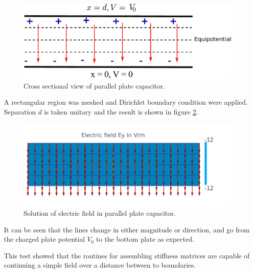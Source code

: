\begin{figure}
\centering
\includegraphics[scale=0.5]{./img/parallel_plate_capacitor.pdf}
\caption{Cross sectional view of parallel plate capacitor.}
\label{fig:parallel_plate}
\end{figure}

A rectangular region  was meshed and Dirichlet boundary condition were applied.  Separation $d$ is taken unitary and the result is shown in figure \ref{fig:capacitor}. 

\begin{figure}
\centering
\includegraphics[scale=0.3]{./img/capacitor.pdf}
\caption{Solution of electric field in parallel plate capacitor.}
\label{fig:capacitor}
\end{figure}

It can be seen that the lines  change in either magnitude or direction, and go from the charged plate  potential $V_0$ to the bottom plate as expected.

This test showed that the routines for assembling stiffness matrices are capable of continuing a simple field over a distance between to boundaries.  


